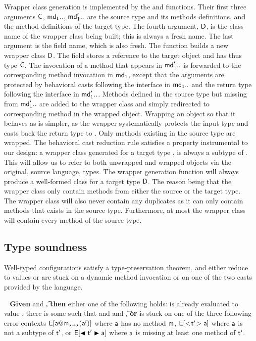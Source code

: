 \documentclass[acmsmall, anonymous, authordraft, review]{acmart} %
\begin{document}
Wrapper class generation is implemented by the  and 
functions. Their first three arguments \(\C\), \(\md[1]..\), \(\mdp[1]..\)
are the source type and its methods definitions, and the method definitions
of the target type. The fourth argument, \(\D\), is the class name of the
wrapper class being built; this is always a fresh name. The last argument is
the \that field name, which is also fresh.  The function builds a new
wrapper class \(\D\).  The field \that stores a reference to the target
object and has thus type \(\C\).  The invocation of a method that appears in
\(\mdp[1]..\) is forwarded to the corresponding method invocation in
\(\md[1]\), except that the arguments are protected by behavioral casts
following the interface in \(\md[1]..\) and the return type following the
interface in \(\mdp[1]..\).  Methods defined in the source type but missing
from \(\mdp[1]..\) are added to the wrapper class and simply redirected to
corresponding method in the wrapped object.  Wrapping an object so that it
behaves as \any is simpler, as the wrapper systematically protects the input
type and casts back the return type to \any. Only methods existing in the
source type are wrapped. The behavioral cast reduction rule satisfies a
property instrumental to our design: a wrapper class generated for a target
type \D, is always a subtype of \D.  This will allow us to refer to both
unwrapped and wrapped objects via the original, source language, types. The
wrapper generation function will always produce a well-formed class for a
target type $\D$. The reason being that the wrapper class only contain
methods from either the source or the target type. The wrapper class will
also never contain any duplicates as it can only contain methods that exists
in the source type.  Furthermore, at most the wrapper class will contain
every method of the source type.

\subsection{Type soundness} 
Well-typed \kafka configurations satisfy a type-preservation theorem, and
either reduce to values or are stuck on a dynamic method invocation or on
one of the two casts provided by the language.

\medskip{} ~  
{\bf Given} \WFp\K{\e~\s} and
      \EnvType\cdot\s\K\e\t,
{\bf then} either one of the following holds:
    \e is already evaluated to value \a,      
    there is some \ep such that \Reduce \K\e\s \Kp\ep\sp and
       \WFp\Kp{\ep~\sp} and \EnvType\cdot\sp\Kp\ep\t,
{\bf or} \e is stuck on one of the three following error contexts
    $\EE[\DynCall\a\m{\ap}]$ where $\a$ has no method ${\sf{m}}$,
    $\EE[\SubCast\tp\a]$ where $\a$ is not a subtype of $\tp$,
   or $\EE[\BehCast\tp\a]$ where $\a$ is missing at least one method of $\tp$.\\
\end{document}
